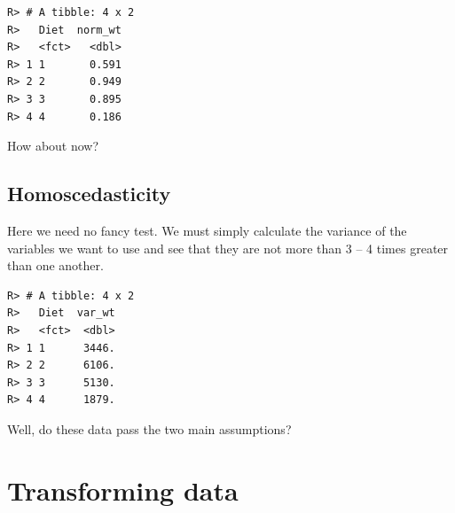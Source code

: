 \documentclass[english,10pt,a4paper,oneside]{book}
\newenvironment{Shaded}{\begin{snugshade}}{\end{snugshade}}
\newcommand{\KeywordTok}[1]{\textcolor[rgb]{0.13,0.29,0.53}{\textbf{#1}}}
\newcommand{\DataTypeTok}[1]{\textcolor[rgb]{0.13,0.29,0.53}{#1}}
\newcommand{\DecValTok}[1]{\textcolor[rgb]{0.00,0.00,0.81}{#1}}
\newcommand{\StringTok}[1]{\textcolor[rgb]{0.31,0.60,0.02}{#1}}
\newcommand{\OperatorTok}[1]{\textcolor[rgb]{0.81,0.36,0.00}{\textbf{#1}}}
\newcommand{\NormalTok}[1]{#1}
\theoremstyle{definition}
\theoremstyle{definition}
\theoremstyle{definition}
\theoremstyle{remark}
\begin{document}
\begin{Shaded}
\end{Shaded}

\begin{verbatim}
R> # A tibble: 4 x 2
R>   Diet  norm_wt
R>   <fct>   <dbl>
R> 1 1       0.591
R> 2 2       0.949
R> 3 3       0.895
R> 4 4       0.186
\end{verbatim}

How about now?

\subsection{Homoscedasticity}\label{homoscedasticity-1}

Here we need no fancy test. We must simply calculate the variance of the
variables we want to use and see that they are not more than 3 -- 4
times greater than one another.

\begin{Shaded}
\end{Shaded}

\begin{verbatim}
R> # A tibble: 4 x 2
R>   Diet  var_wt
R>   <fct>  <dbl>
R> 1 1      3446.
R> 2 2      6106.
R> 3 3      5130.
R> 4 4      1879.
\end{verbatim}

Well, do these data pass the two main assumptions?

\section{Transforming data}\label{transforming-data}
\end{document}
